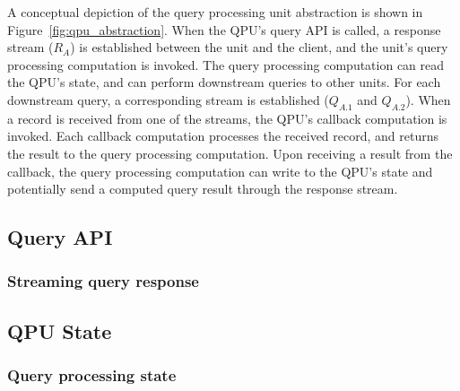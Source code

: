 A conceptual depiction of the query processing unit abstraction is shown in Figure~\ref{fig:qpu_abstraction}.
When the QPU's query API is called, a response stream ($R_A$) is established between the unit and the client, and
the unit's query processing computation is invoked.
The query processing computation can read the QPU's state, and can perform downstream queries to other units.
For each downstream query, a corresponding stream is established ($Q_{A.1}$ and $Q_{A.2}$).
When a record is received from one of the streams, the QPU's callback computation is invoked.
Each callback computation processes the received record, and returns the result to the query processing computation.
Upon receiving a result from the callback, the query processing computation can write to the QPU's
state and potentially send a computed query result through the response stream.


\subsection{Query API}



\subsubsection{Streaming query response}



\subsection{QPU State}

\subsubsection{Query processing state}
